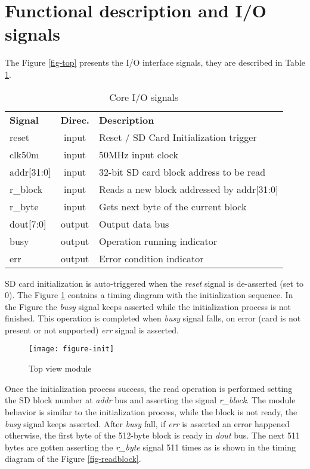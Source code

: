 \documentclass[oneside]{article}
\begin{document}
\section*{Functional description and I/O signals}

The Figure \ref{fig-top} presents the I/O interface signals, 
they are described in Table \ref{tab_signals}. 


\begin{table}[H]
\centering
\begin{tabular}{ | l c l | } 
 \hline
  \bfseries Signal & \bfseries Direc. & \bfseries Description \\
  reset  & input & Reset / SD Card Initialization trigger  \\ %
  clk50m & input & 50MHz input clock \\ %
  addr[31:0] & input & 32-bit SD card block address to be read  \\
  r\_block & input & Reads a new block addressed by addr[31:0]  \\
  r\_byte &  input & Gets next byte of the current block \\
  dout[7:0] &  output & Output data bus \\
  busy & output & Operation running indicator \\
  err & output & Error condition indicator \\
  \hline  
\end{tabular}
\caption{Core I/O signals}
\label{tab_signals}
\end{table}

SD card initialization is auto-triggered when the \emph{reset} signal 
is de-asserted (set to 0). The Figure \ref{fig-init} contains a timing diagram 
with the initialization sequence.  In the Figure the \emph{busy} 
signal keeps asserted while the initialization process is not finished. This 
operation is completed when \emph{busy} signal falls, 
on error (card is not present or not supported) \emph{err} signal is asserted. 

\begin{figure}[H]
\centering
\texttt{[image: figure-init]}
\caption{Top view module}
\label{fig-init}
\end{figure}

Once the initialization process success, the read operation is performed 
setting the SD block number at \emph{addr} bus and asserting the signal 
\emph{r\_block}. The module behavior is similar to the initialization process,
while the block is not ready, the \emph{busy} signal keeps asserted. After
\emph{busy} fall, if \emph{err} is asserted an error happened otherwise,
the first byte of the 512-byte block is ready in \emph{dout} bus. The 
next 511 bytes are gotten asserting the \emph{r\_byte} signal 511 times as is
shown in the timing diagram of the Figure \ref{fig-readblock}.
\end{document}

